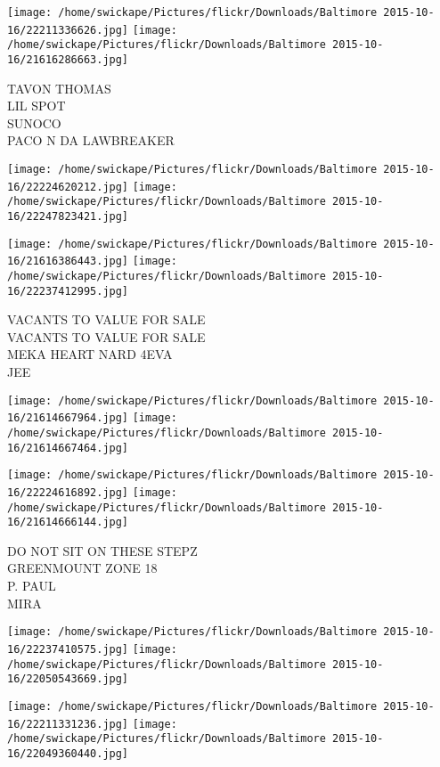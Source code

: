 \documentclass[10pt,letterpaper]{article}
\begin{document}
\texttt{[image: /home/swickape/Pictures/flickr/Downloads/Baltimore 2015-10-16/22211336626.jpg]}
\texttt{[image: /home/swickape/Pictures/flickr/Downloads/Baltimore 2015-10-16/21616286663.jpg]}

TAVON THOMAS\\
LIL SPOT\\
SUNOCO\\
PACO N DA LAWBREAKER\\
\pagebreak

\texttt{[image: /home/swickape/Pictures/flickr/Downloads/Baltimore 2015-10-16/22224620212.jpg]}
\texttt{[image: /home/swickape/Pictures/flickr/Downloads/Baltimore 2015-10-16/22247823421.jpg]}

\texttt{[image: /home/swickape/Pictures/flickr/Downloads/Baltimore 2015-10-16/21616386443.jpg]}
\texttt{[image: /home/swickape/Pictures/flickr/Downloads/Baltimore 2015-10-16/22237412995.jpg]}

VACANTS TO VALUE FOR SALE\\
VACANTS TO VALUE FOR SALE\\
MEKA HEART NARD 4EVA\\
JEE\\
\pagebreak

\texttt{[image: /home/swickape/Pictures/flickr/Downloads/Baltimore 2015-10-16/21614667964.jpg]}
\texttt{[image: /home/swickape/Pictures/flickr/Downloads/Baltimore 2015-10-16/21614667464.jpg]}

\texttt{[image: /home/swickape/Pictures/flickr/Downloads/Baltimore 2015-10-16/22224616892.jpg]}
\texttt{[image: /home/swickape/Pictures/flickr/Downloads/Baltimore 2015-10-16/21614666144.jpg]}

DO NOT SIT ON THESE STEPZ\\
GREENMOUNT ZONE 18\\
P. PAUL\\
MIRA\\
\pagebreak

\texttt{[image: /home/swickape/Pictures/flickr/Downloads/Baltimore 2015-10-16/22237410575.jpg]}
\texttt{[image: /home/swickape/Pictures/flickr/Downloads/Baltimore 2015-10-16/22050543669.jpg]}

\texttt{[image: /home/swickape/Pictures/flickr/Downloads/Baltimore 2015-10-16/22211331236.jpg]}
\texttt{[image: /home/swickape/Pictures/flickr/Downloads/Baltimore 2015-10-16/22049360440.jpg]}
\end{document}
